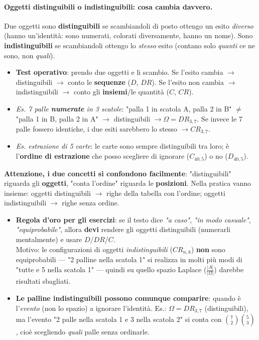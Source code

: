 \documentclass[12pt]{extarticle} %
\begin{document}
\paragraph{Oggetti distinguibili o indistinguibili: cosa cambia davvero.}
Due oggetti sono \textbf{distinguibili} se scambiandoli di posto ottengo un esito \emph{diverso} (hanno un'identità: sono numerati, colorati diversamente, hanno un nome). Sono \textbf{indistinguibili} se scambiandoli ottengo lo \emph{stesso} esito (contano solo \emph{quanti} ce ne sono, non \emph{quali}).
\begin{itemize}
    \item \textbf{Test operativo}: prendo due oggetti e li scambio. Se l'esito cambia $\to$ distinguibili $\to$ conto le \textbf{sequenze} ($D$, $DR$). Se l'esito non cambia $\to$ indistinguibili $\to$ conto gli \textbf{insiemi}/le quantità ($C$, $CR$).
    \item {\footnotesize \textit{Es. 7 palle \textbf{numerate} in 3 scatole}: "palla 1 in scatola A, palla 2 in B" $\ne$ "palla 1 in B, palla 2 in A" $\to$ distinguibili $\to \Omega = DR_{3,7}$. Se invece le 7 palle fossero identiche, i due esiti sarebbero lo stesso $\to CR_{3,7}$.}
    \item {\footnotesize \textit{Es. estrazione di 5 carte}: le carte sono sempre distinguibili tra loro; è l'\textbf{ordine di estrazione} che posso scegliere di ignorare ($C_{40,5}$) o no ($D_{40,5}$).}
\end{itemize}
\textbf{Attenzione, i due concetti si confondono facilmente}: "distinguibili" riguarda gli \textbf{oggetti}, "conta l'ordine" riguarda le \textbf{posizioni}. Nella pratica vanno insieme: oggetti distinguibili $\to$ righe della tabella con l'ordine; oggetti indistinguibili $\to$ righe senza ordine.
\begin{itemize}
    \item \textbf{Regola d'oro per gli esercizi}: se il testo dice \emph{"a caso"}, \emph{"in modo casuale"}, \emph{"equiprobabile"}, allora \textbf{devi} rendere gli oggetti distinguibili (numerarli mentalmente) e usare $D$/$DR$/$C$. \\ {\footnotesize Motivo: le configurazioni di oggetti \emph{indistinguibili} ($CR_{n,k}$) \textbf{non} sono equiprobabili — "2 palline nella scatola 1" si realizza in molti più modi di "tutte e 5 nella scatola 1" — quindi su quello spazio Laplace ($\frac{|A|}{|\Omega|}$) darebbe risultati sbagliati.}
    \item \textbf{Le palline indistinguibili possono comunque comparire}: quando è l'\emph{evento} (non lo spazio) a ignorare l'identità. {\footnotesize Es.: $\Omega = DR_{3,7}$ (distinguibili), ma l'evento "2 palle nella scatola 1 e 3 nella scatola 2" si conta con $\binom{7}{2}\binom{5}{3}$, cioè scegliendo \emph{quali} palle senza ordinarle.}
\end{itemize}
\end{document}
